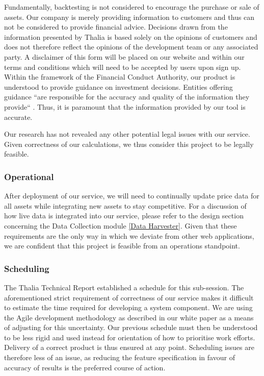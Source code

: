 \documentclass[main.tex]{subfiles}
\begin{document}
Fundamentally, backtesting is not considered to encourage the purchase or sale of assets. Our company is merely providing information to customers and thus can not be considered to provide financial advice. Decisions drawn from the information presented by Thalia is based solely on the opinions of customers and does not therefore reflect the opinions of the development team or any associated party. A disclaimer of this form will be placed on our website and within our terms and conditions which will need to be accepted by users upon sign up.
Within the framework of the Financial Conduct Authority, our product is understood to provide guidance on investment decisions. Entities offering guidance ``are responsible for the accuracy and quality of the information they provide`` \cite{fca_guidance_advice}. Thus, it is paramount that the information provided by our tool is accurate.

Our research has not revealed any other potential legal issues with our service. Given correctness of our calculations, we thus consider this project to be legally feasible.

\subsubsection{Operational}

After deployment of our service, we will need to continually update price data for all assets while integrating new assets to stay competitive. For a discussion of how live data is integrated into our service, please refer to the design section concerning the Data Collection module \ref{Data Harvester}. Given that these requirements are the only way in which we deviate from other web applications, we are confident that this project is feasible from an operations standpoint.

\subsubsection{Scheduling}

The Thalia Technical Report established a schedule for this sub-session. The aforementioned strict requirement of correctness of our service makes it difficult to estimate the time required for developing a system component. We are using the Agile development methodology as described in our white paper \cite{WP} as a means of adjusting for this uncertainty. Our previous schedule must then be understood to be less rigid and used instead for orientation of how to prioritise work efforts. Delivery of a correct product is thus ensured at any point. Scheduling issues are therefore less of an issue, as reducing the feature specification in favour of accuracy of results is the preferred course of action.
\end{document}
